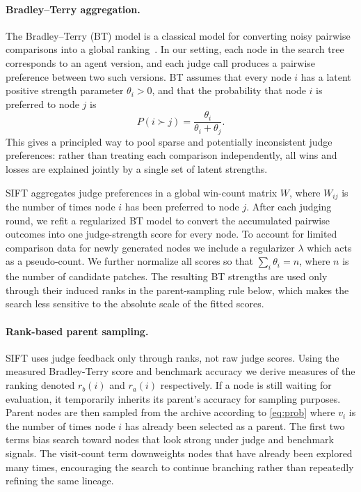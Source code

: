 \documentclass{article}
\begin{document}
\paragraph{Bradley--Terry aggregation.}
The Bradley--Terry (BT) model is a classical model for converting noisy pairwise comparisons into a global ranking~\citep{bradleyterry1952}. In our setting, each node in the search tree corresponds to an agent version, and each judge call produces a pairwise preference between two such versions. BT assumes that every node $i$ has a latent positive strength parameter $\theta_i > 0$, and that the probability that node $i$ is preferred to node $j$ is
\[
    P(i \succ j)
    =
    \frac{\theta_i}{\theta_i + \theta_j}.
\]
This gives a principled way to pool sparse and potentially inconsistent judge preferences: rather than treating each comparison independently, all wins and losses are explained jointly by a single set of latent strengths.

SIFT aggregates judge preferences in a global win-count matrix $W$, where $W_{ij}$ is the number of times node $i$ has been preferred to node $j$. After each judging round, we refit a regularized BT model to convert the accumulated pairwise outcomes into one judge-strength score for every node. %
To account for limited comparison data for newly generated nodes we include a regularizer $\lambda$ which acts as a pseudo-count.
We further normalize all scores so that $\sum_i \theta_i = n$, where $n$ is the number of candidate patches.
The resulting BT strengths are used only through their induced ranks in the parent-sampling rule below, which makes the search less sensitive to the absolute scale of the fitted scores.

\paragraph{Rank-based parent sampling.}
\label{sec:sample}
SIFT uses judge feedback only through ranks, not raw judge scores. 
Using the measured Bradley-Terry score and benchmark accuracy we derive measures of the ranking denoted $r_b(i)$ and $r_a(i)$ respectively.
If a node is still waiting for evaluation, it temporarily inherits its parent's accuracy for sampling purposes. Parent nodes are then sampled from the archive according to \eqref{eq:prob} where $v_i$ is the number of times node $i$ has already been selected as a parent. The first two terms bias search toward nodes that look strong under judge and benchmark signals. The visit-count term downweights nodes that have already been explored many times, encouraging the search to continue branching rather than repeatedly refining the same lineage.
\end{document}
